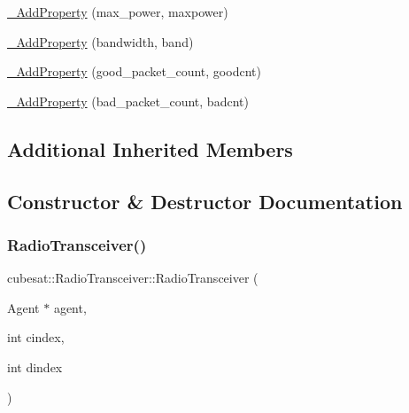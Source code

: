 \begin{DoxyCompactItemize}
\item 
\hyperlink{classcubesat_1_1RadioTransceiver_a20d8b9573699dbbd3852d4833ee8e68f}{\+\_\+\+Add\+Property} (max\+\_\+power, maxpower)
\item 
\hyperlink{classcubesat_1_1RadioTransceiver_a6063051de0ead97cca2dd6bf47a63a53}{\+\_\+\+Add\+Property} (bandwidth, band)
\item 
\hyperlink{classcubesat_1_1RadioTransceiver_a1e06f3051377b0df184021daca19475a}{\+\_\+\+Add\+Property} (good\+\_\+packet\+\_\+count, goodcnt)
\item 
\hyperlink{classcubesat_1_1RadioTransceiver_adae4d603a281ba18f4fd0f7583f43371}{\+\_\+\+Add\+Property} (bad\+\_\+packet\+\_\+count, badcnt)
\end{DoxyCompactItemize}
\subsection*{Additional Inherited Members}


\subsection{Constructor \& Destructor Documentation}
\mbox{\label{classcubesat_1_1RadioTransceiver_af785e8d80b098be752539b404186e6cb}} 
\subsubsection{\texorpdfstring{Radio\+Transceiver()}{RadioTransceiver()}}
{\footnotesize\ttfamily cubesat\+::\+Radio\+Transceiver\+::\+Radio\+Transceiver (\begin{DoxyParamCaption}\item[{Agent $\ast$}]{agent,  }\item[{int}]{cindex,  }\item[{int}]{dindex }\end{DoxyParamCaption})\hspace{0.3cm}{\ttfamily [inline]}}

\mbox{\label{classcubesat_1_1RadioTransceiver_a30988a36b57334c7c24131e1dd1660c0}} 
